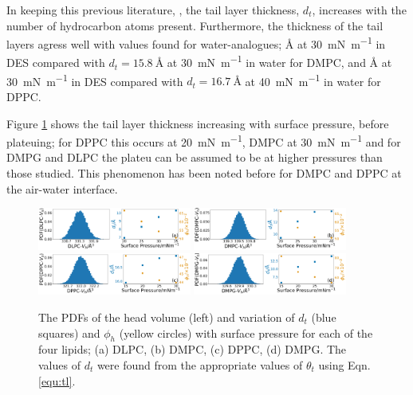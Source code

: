 \documentclass[%
 reprint,
 amsmath,amssymb,
 prl,
]{revtex4-1}
\begin{document}
In keeping this previous literature, \cite{Mohwald1990,Vaknin1991}, the tail layer thickness, $d_t$, increases with the number of hydrocarbon atoms present.
Furthermore, the thickness of the tail layers agress well with values found for water-analogues; \si{\angstrom} at \SI{30}{\milli\newton\per\meter} in DES compared with $d_t=\SI{15.8}{\angstrom}$ at \SI{30}{\milli\newton\per\meter}\cite{Johnson1991} in water for DMPC, and \si{\angstrom} at \SI{30}{\milli\newton\per\meter} in DES compared with $d_t=\SI{16.7}{\angstrom}$ at \SI{40}{\milli\newton\per\meter}\cite{Helm1987} in water for DPPC.

Figure \ref{fig:lipresults} shows the tail layer thickness increasing with surface pressure, before plateuing; for DPPC this occurs at \SI{20}{\milli\newton\per\meter}, DMPC at \SI{30}{\milli\newton\per\meter} and for DMPG and DLPC the plateu can be assumed to be at higher pressures than those studied.
This phenomenon has been noted before for DMPC\cite{Bayerl1990} and DPPC\cite{Campbell2018} at the air-water interface.
%
\begin{figure}
	\centering
	\includegraphics[width=0.45\textwidth]{figures/dlpc_vh_dt_phi}
	\includegraphics[width=0.45\textwidth]{figures/dmpc_vh_dt_phi}
	\includegraphics[width=0.45\textwidth]{figures/dppc_vh_dt_phi}
	\includegraphics[width=0.45\textwidth]{figures/dmpg_vh_dt_phi}
	\caption{The PDFs of the head volume (left) and variation of $d_t$ (blue squares) and $\phi_h$ (yellow circles) with surface pressure for each of the four lipids; (a) DLPC, (b) DMPC, (c) DPPC, (d) DMPG. The values of $d_t$ were found from the appropriate values of $\theta_t$ using Eqn. \ref{equ:tl}.}
	\label{fig:lipresults}
\end{figure}
%
\end{document}
